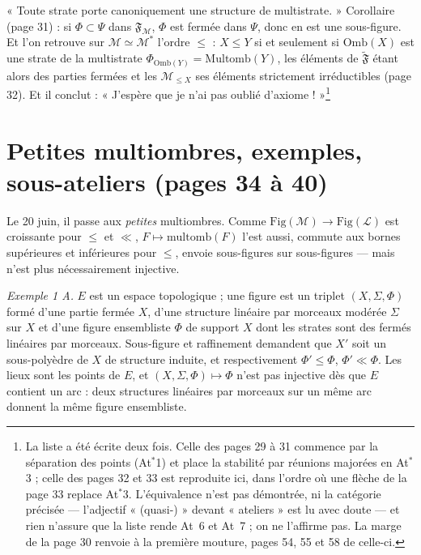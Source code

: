 \documentclass[11pt,a4paper]{article}
\begin{document}
« Toute strate porte canoniquement une structure de multistrate. » Corollaire
(page 31) : si $\Phi \subset \Psi$ dans $\mathfrak{F}_{\mathcal{M}}$, $\Phi$ est
fermée dans $\Psi$, donc en est une sous-figure. Et l'on retrouve sur
$\mathcal{M} \simeq \mathcal{M}^{*}$ l'ordre $\leq$ : $X \leq Y$ si et seulement
si $\mathrm{Omb}(X)$ est une strate de la multistrate $\Phi_{\mathrm{Omb}(Y)} =
\mathrm{Multomb}(Y)$, les éléments de $\widetilde{\mathfrak{F}}$ étant alors des
parties fermées et les $\mathcal{M}_{\leq X}$ ses éléments strictement
irréductibles (page 32). Et il conclut :
« J'espère que je n'ai pas oublié d'axiome ! »\footnote{La liste a été écrite deux
fois. Celle des pages 29 à 31 commence par la séparation des points (At$^{*}$1)
et place la stabilité par réunions majorées en At$^{*}$3 ; celle des pages 32 et
33 est reproduite ici, dans l'ordre où une flèche de la page 33 replace At$^{*}$3.
L'équivalence n'est pas démontrée, ni la catégorie précisée --- l'adjectif
« (quasi-) » devant « ateliers » est lu avec doute --- et rien n'assure que la
liste rende At~6 et At~7 ; on ne l'affirme pas. La marge de la page 30 renvoie à
la première mouture, pages 54, 55 et 58 de celle-ci.}

\section*{Petites multiombres, exemples, sous-ateliers (pages 34 à 40)}

Le 20 juin, il passe aux \emph{petites} multiombres. Comme $\mathrm{Fig}(\mathcal{M})
\to \mathrm{Fig}(\mathcal{L})$ est croissante pour $\leq$ et $\ll$, $F \mapsto
\mathrm{multomb}(F)$ l'est aussi, commute aux bornes supérieures et inférieures
pour $\leq$, envoie sous-figures sur sous-figures --- mais n'est plus
nécessairement injective.

\emph{Exemple 1 A.} $E$ est un espace topologique ; une figure est un triplet
$(X, \Sigma, \Phi)$ formé d'une partie fermée $X$, d'une structure linéaire par
morceaux modérée $\Sigma$ sur $X$ et d'une figure ensembliste $\Phi$ de support
$X$ dont les strates sont des fermés linéaires par morceaux. Sous-figure et
raffinement demandent que $X'$ soit un sous-polyèdre de $X$ de structure
induite, et respectivement $\Phi' \leq \Phi$, $\Phi' \ll \Phi$. Les lieux sont
les points de $E$, et $(X, \Sigma, \Phi) \mapsto \Phi$ n'est pas injective dès
que $E$ contient un arc : deux structures linéaires par morceaux sur un même
arc donnent la même figure ensembliste.
\end{document}
